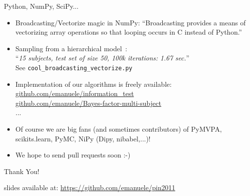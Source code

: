 \documentclass{beamer}
\begin{document}
\begin{frame}{Python, NumPy, SciPy...}
  \begin{itemize}
  \item Broadcasting/Vectorize magic in NumPy: ``Broadcasting provides
    a means of vectorizing array operations so that looping occurs in
    C instead of
    Python.''%
  \item Sampling from a hierarchical model~\cite{olivetti2011bayesian}:\\
  ``\emph{15 subjects, test set of size 50, 100k iterations: \alert{1.67 sec.}}''\\
  See \texttt{cool\_broadcasting\_vectorize.py}\\
  \item Implementation of our algorithms is freely available:\\
    \small{\url{github.com/emanuele/information_test}}\\
    \small{\url{github.com/emanuele/Bayes-factor-multi-subject}}\\
    ...
  \item Of course we are big fans (and sometimes contributors) of
    PyMVPA, scikits.learn, PyMC, NiPy (Dipy, nibabel,...)!
  \item We hope to send pull requests soon :-)
  \end{itemize}
\end{frame}

\begin{frame}
  \begin{center}
    \LARGE{\alert{Thank You!}}
  \end{center}
  \begin{center}
    slides available at:
    \url{https://github.com/emanuele/pin2011}
  \end{center}
\end{frame}
\end{document}
